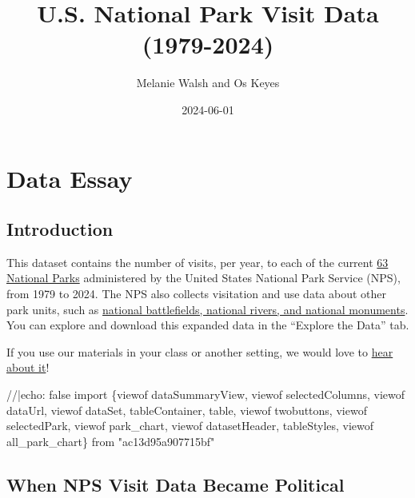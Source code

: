 \documentclass[
  letterpaper,
  DIV=11,
  numbers=noendperiod]{scrartcl}
\title{U.S. National Park Visit Data (1979-2024)}
\author{Melanie Walsh and Os Keyes}
\date{2024-06-01}
\newenvironment{Shaded}{\begin{snugshade}}{\end{snugshade}}
\newcommand{\NormalTok}[1]{\textcolor[rgb]{0.00,0.23,0.31}{#1}}
\begin{document}
\maketitle


\section{Data Essay}

\subsection{Introduction}\label{introduction}

This dataset contains the number of visits, per year, to each of the
current
\href{https://en.wikipedia.org/wiki/List_of_national_parks_of_the_United_States\#National_parks}{63
National Parks} administered by the United States National Park Service
(NPS), from 1979 to 2024. The NPS also collects visitation and use data
about other park units, such as
\href{(https://www.nps.gov/aboutus/national-park-system.htm)}{national
battlefields, national rivers, and national monuments}. You can explore
and download this expanded data in the ``Explore the Data'' tab.

\begin{tcolorbox}[enhanced jigsaw, opacityback=0, toptitle=1mm, colframe=quarto-callout-tip-color-frame, breakable, toprule=.15mm, rightrule=.15mm, left=2mm, colbacktitle=quarto-callout-tip-color!10!white, bottomrule=.15mm, arc=.35mm, bottomtitle=1mm, titlerule=0mm, title={Brief Survey}, leftrule=.75mm, coltitle=black, opacitybacktitle=0.6, colback=white]

If you use our materials in your class or another setting, we would love
to \href{https://forms.gle/yJpQscUH9k9Rn4Qy9}{hear about it}!

\end{tcolorbox}

\begin{Shaded}
\begin{Highlighting}[]
\NormalTok{//|echo: false}
\NormalTok{import \{viewof dataSummaryView, viewof selectedColumns, viewof dataUrl, viewof dataSet, tableContainer, table, viewof twobuttons, viewof selectedPark, viewof park\_chart, viewof datasetHeader, tableStyles, viewof all\_park\_chart\} from "ac13d95a907715bf"}
\end{Highlighting}
\end{Shaded}

\subsection{When NPS Visit Data Became
Political}\label{when-nps-visit-data-became-political}
\end{document}
